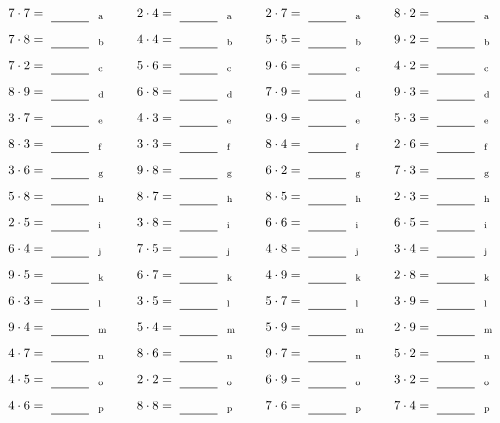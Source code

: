 \documentclass
[
  draft    = true,
  fontsize = 11pt,
  parskip  = half-
]
{scrartcl}
\begin{document}
\par\vfill\par
\begin{align*}
    \pline{7\cdot7}&=\rline{a}
  & \pline{2\cdot4}&=\rline{a}
  & \pline{2\cdot7}&=\rline{a}
  & \pline{8\cdot2}&=\rline{a} \\[1ex]
    \pline{7\cdot8}&=\rline{b}
  & \pline{4\cdot4}&=\rline{b}
  & \pline{5\cdot5}&=\rline{b}
  & \pline{9\cdot2}&=\rline{b} \\[1ex]
    \pline{7\cdot2}&=\rline{c}
  & \pline{5\cdot6}&=\rline{c}
  & \pline{9\cdot6}&=\rline{c}
  & \pline{4\cdot2}&=\rline{c} \\[1ex]
    \pline{8\cdot9}&=\rline{d}
  & \pline{6\cdot8}&=\rline{d}
  & \pline{7\cdot9}&=\rline{d}
  & \pline{9\cdot3}&=\rline{d} \\[1ex]
    \pline{3\cdot7}&=\rline{e}
  & \pline{4\cdot3}&=\rline{e}
  & \pline{9\cdot9}&=\rline{e}
  & \pline{5\cdot3}&=\rline{e} \\[1ex]
    \pline{8\cdot3}&=\rline{f}
  & \pline{3\cdot3}&=\rline{f}
  & \pline{8\cdot4}&=\rline{f}
  & \pline{2\cdot6}&=\rline{f} \\[1ex]
    \pline{3\cdot6}&=\rline{g}
  & \pline{9\cdot8}&=\rline{g}
  & \pline{6\cdot2}&=\rline{g}
  & \pline{7\cdot3}&=\rline{g} \\[1ex]
    \pline{5\cdot8}&=\rline{h}
  & \pline{8\cdot7}&=\rline{h}
  & \pline{8\cdot5}&=\rline{h}
  & \pline{2\cdot3}&=\rline{h} \\[1ex]
    \pline{2\cdot5}&=\rline{i}
  & \pline{3\cdot8}&=\rline{i}
  & \pline{6\cdot6}&=\rline{i}
  & \pline{6\cdot5}&=\rline{i} \\[1ex]
    \pline{6\cdot4}&=\rline{j}
  & \pline{7\cdot5}&=\rline{j}
  & \pline{4\cdot8}&=\rline{j}
  & \pline{3\cdot4}&=\rline{j} \\[1ex]
    \pline{9\cdot5}&=\rline{k}
  & \pline{6\cdot7}&=\rline{k}
  & \pline{4\cdot9}&=\rline{k}
  & \pline{2\cdot8}&=\rline{k} \\[1ex]
    \pline{6\cdot3}&=\rline{l}
  & \pline{3\cdot5}&=\rline{l}
  & \pline{5\cdot7}&=\rline{l}
  & \pline{3\cdot9}&=\rline{l} \\[1ex]
    \pline{9\cdot4}&=\rline{m}
  & \pline{5\cdot4}&=\rline{m}
  & \pline{5\cdot9}&=\rline{m}
  & \pline{2\cdot9}&=\rline{m} \\[1ex]
    \pline{4\cdot7}&=\rline{n}
  & \pline{8\cdot6}&=\rline{n}
  & \pline{9\cdot7}&=\rline{n}
  & \pline{5\cdot2}&=\rline{n} \\[1ex]
    \pline{4\cdot5}&=\rline{o}
  & \pline{2\cdot2}&=\rline{o}
  & \pline{6\cdot9}&=\rline{o}
  & \pline{3\cdot2}&=\rline{o} \\[1ex]
    \pline{4\cdot6}&=\rline{p}
  & \pline{8\cdot8}&=\rline{p}
  & \pline{7\cdot6}&=\rline{p}
  & \pline{7\cdot4}&=\rline{p}
\end{align*}
\end{document}
